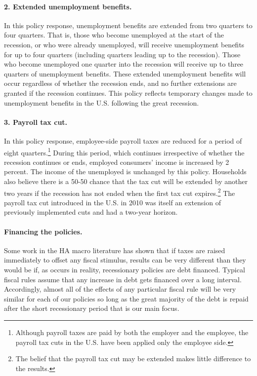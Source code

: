 \documentclass[\econtexRoot/HAFiscal]{subfiles}
\begin{document}
\paragraph{2. Extended unemployment benefits.} In this policy response, unemployment benefits are extended from two quarters to four quarters. That is, those who become unemployed at the start of the recession, or who were already unemployed, will receive unemployment benefits for up to four quarters (including quarters leading up to the recession). Those who become unemployed one quarter into the recession will receive up to three quarters of unemployment benefits. These extended unemployment benefits will occur regardless of whether the recession ends, and no further extensions are granted if the recession continues. This policy reflects temporary changes made to unemployment benefits in the U.S. following the great recession.

\paragraph{3. Payroll tax cut.} In this policy response, employee-side payroll taxes are reduced for a period of eight quarters.\footnote{Although payroll taxes are paid by both the employer and the employee, the payroll tax cuts in the U.S. have been applied only the employee side.} During this period, which continues irrespective of whether the recession continues or ends, employed consumers' income is increased by 2 percent. The income of the unemployed is unchanged by this policy. Households also believe there is a 50-50 chance that the tax cut will be extended by another two years if the recession has not ended when the first tax cut expires.\footnote{The belief that the payroll tax cut may be extended makes little difference to the results.} The payroll tax cut introduced in the U.S. in 2010 was itself an extension of previously implemented cuts and had a two-year horizon.

\paragraph{Financing the policies.} Some work in the HA macro literature has shown that if taxes are raised immediately to offset any fiscal stimulus, results can be very different than they would be if, as occurs in reality, recessionary policies are debt financed.  Typical fiscal rules assume that any increase in debt gets financed over a long interval. Accordingly, almost all of the effects of any particular fiscal rule will be very similar for each of our policies so long as the great majority of the debt is repaid after the short recessionary period that is our main focus.
\end{document}
